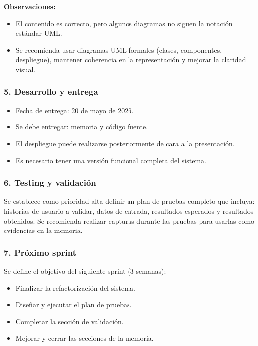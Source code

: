 \textbf{Observaciones:}
\begin{itemize}
    \item El contenido es correcto, pero algunos diagramas no siguen la notación estándar UML.
    \item Se recomienda usar diagramas UML formales (clases, componentes, despliegue), mantener coherencia en la representación y mejorar la claridad visual.
\end{itemize}

\subsubsection*{5. Desarrollo y entrega}
\begin{itemize}
    \item Fecha de entrega: 20 de mayo de 2026.
    \item Se debe entregar: memoria y código fuente.
    \item El despliegue puede realizarse posteriormente de cara a la presentación.
    \item Es necesario tener una versión funcional completa del sistema.
\end{itemize}

\subsubsection*{6. Testing y validación}
Se establece como prioridad alta definir un plan de pruebas completo que incluya: historias de usuario a validar, datos de entrada, resultados esperados y resultados obtenidos. Se recomienda realizar capturas durante las pruebas para usarlas como evidencias en la memoria.

\subsubsection*{7. Próximo sprint}
Se define el objetivo del siguiente sprint (3 semanas):

\begin{itemize}
    \item Finalizar la refactorización del sistema.
    \item Diseñar y ejecutar el plan de pruebas.
    \item Completar la sección de validación.
    \item Mejorar y cerrar las secciones de la memoria.
\end{itemize}

